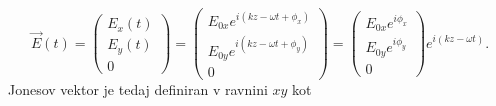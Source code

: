 \documentclass[12pt]{article}
\begin{document}
\begin{equation}
{\displaystyle \vec{E}(t) = {\begin{pmatrix}E_{x}(t)\\E_{y}(t)\\0\end{pmatrix}}={\begin{pmatrix}E_{0x}e^{i(kz-\omega t+\phi _{x})}\\E_{0y}e^{i(kz-\omega t+\phi _{y})}\\0\end{pmatrix}}={\begin{pmatrix}E_{0x}e^{i\phi _{x}}\\E_{0y}e^{i\phi _{y}}\\0\end{pmatrix}}e^{i(kz-\omega t)}.}
\end{equation}  
Jonesov vektor je tedaj definiran v ravnini $xy$ kot
\end{document}
